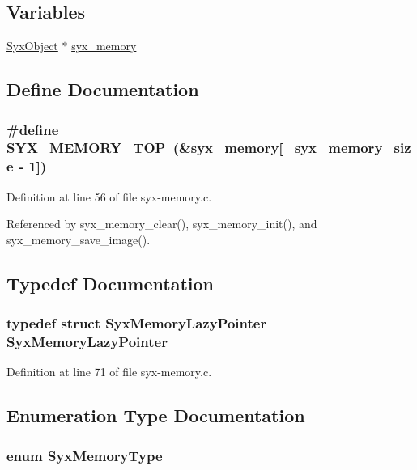 \subsection*{Variables}
\begin{CompactItemize}
\item 
\hyperlink{struct_syx_object}{SyxObject} $\ast$ \hyperlink{syx-memory_8c_e9e3c062a63b7ee6b13ca9e026af87b6}{syx\_\-memory}
\end{CompactItemize}


\subsection{Define Documentation}
\hypertarget{syx-memory_8c_37057b4e55064ea756bd4713d9b9d3b2}{
\subsubsection{\setlength{\rightskip}{0pt plus 5cm}\#define SYX\_\-MEMORY\_\-TOP~(\&{\bf syx\_\-memory}\mbox{[}\_\-syx\_\-memory\_\-size - 1\mbox{]})}}
\label{syx-memory_8c_37057b4e55064ea756bd4713d9b9d3b2}




Definition at line 56 of file syx-memory.c.

Referenced by syx\_\-memory\_\-clear(), syx\_\-memory\_\-init(), and syx\_\-memory\_\-save\_\-image().

\subsection{Typedef Documentation}
\hypertarget{syx-memory_8c_02d5517a6ca46e6109ab7065d4836c3e}{
\subsubsection{\setlength{\rightskip}{0pt plus 5cm}typedef struct {\bf SyxMemoryLazyPointer} {\bf SyxMemoryLazyPointer}}}
\label{syx-memory_8c_02d5517a6ca46e6109ab7065d4836c3e}




Definition at line 71 of file syx-memory.c.

\subsection{Enumeration Type Documentation}
\hypertarget{syx-memory_8c_3c7c89c36d5970f74340ceffe8b58212}{
\subsubsection{\setlength{\rightskip}{0pt plus 5cm}enum {\bf SyxMemoryType}}}
\label{syx-memory_8c_3c7c89c36d5970f74340ceffe8b58212}


